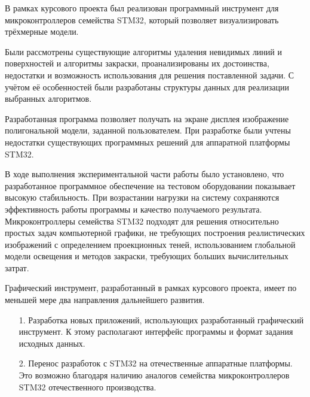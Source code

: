 \Conclusion %
В рамках курсового проекта был реализован программный инструмент для микроконтроллеров семейства STM32, который позволяет 
визуализировать трёхмерные модели.

Были рассмотрены существующие алгоритмы удаления невидимых линий и поверхностей и алгоритмы закраски, проанализированы 
их достоинства, недостатки и возможность использования для решения поставленной задачи. С учётом её особенностей были 
разработаны структуры данных для реализации выбранных алгоритмов.

Разработанная программа позволяет получать на экране дисплея изображение полигональной модели, заданной пользователем. При 
разработке были учтены недостатки существующих программных решений для аппаратной платформы STM32.

В ходе выполнения экспериментальной части работы было установлено, что разработанное программное обеспечение на тестовом оборудовании 
показывает высокую стабильность. При возрастании нагрузки на систему сохраняются эффективность работы программы и качество получаемого 
результата. Микроконтроллеры семейства STM32 подходят для решения относительно простых задач компьютерной графики, не требующих 
построения реалистических изображений с определением проекционных теней, использованием глобальной модели освещения и методов закраски, 
требующих больших вычислительных затрат.

Графический инструмент, разработанный в рамках курсового проекта, имеет по меньшей мере два направления дальнейшего развития.
\begin{enumerate}
	\item[1.] Разработка новых приложений, использующих разработанный графический инструмент. К этому располагают интерфейс программы и формат задания исходных данных.
	\item[2.] Перенос разработок с STM32 на отечественные аппаратные платформы. Это возможно благодаря наличию аналогов семейства микроконтроллеров STM32 отечественного производства.
\end{enumerate}

